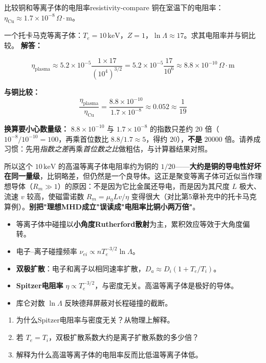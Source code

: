 \documentclass[12pt,a4paper,openany,oneside]{book}
\newcommand{\difficulty}[1]{\marginnote{\hfill\textcolor{coverMid!80}{\rule[-0.1em]{2pt}{0.9em}}\,\textcolor{coverMid}{\footnotesize\textbf{[#1]}}}}
\begin{document}
\begin{example}{比较铜和等离子体的电阻率}{resistivity-compare}
\difficulty{提高}
铜在室温下的电阻率：$\eta_{\text{Cu}} \approx 1.7\times 10^{-8}\,\Omega\cdot\mathrm{m}$。

一个托卡马克等离子体：$T_e = 10\,\mathrm{keV}$，$Z=1$，$\ln\Lambda \approx 17$。求其电阻率并与铜比较。
\tcblower
\textbf{解答：}

\[
\eta_{\text{plasma}} \approx 5.2\times 10^{-5} \frac{1\times 17}{(10^4)^{3/2}} = 5.2\times 10^{-5} \frac{17}{10^6} \approx 8.8\times 10^{-10}\,\Omega\cdot\mathrm{m}
\]

\textbf{与铜比较：}
\[
\frac{\eta_{\text{plasma}}}{\eta_{\text{Cu}}} = \frac{8.8\times 10^{-10}}{1.7\times 10^{-8}} \approx 0.052 \approx \frac{1}{19}
\]

\textbf{换算要小心数量级：} $8.8\times10^{-10}$ 与 $1.7\times10^{-8}$ 的指数只差约 20 倍（$10^{-8}/10^{-10}=100$，再乘首位数比 $8.8/1.7\approx5$，得约 $20$），\textbf{不是} $20000$ 倍。请养成习惯：先用\emph{指数之差}再乘\emph{首位数之比}做粗估，与计算器结果对照。

所以这个 $10\,\mathrm{keV}$ 的高温等离子体电阻率约为铜的 $1/20$——\textbf{大约是铜的导电性好坏在同一量级}，比铜略差，但仍然是一个良导体。这正是聚变等离子体可近似当作理想导体（$R_m\gg1$）的原因：不是因为它比金属还导电，而是因为其尺度 $L$ 极大、流速 $v$ 较高，使磁雷诺数 $R_m=\mu_0Lv/\eta$ 变得很大（对比第5章补充中的托卡马克算例）。\textbf{别把"理想MHD成立"误读成"电阻率比铜小两万倍"}。
\end{example}

\begin{chapterreview}
\begin{itemize}
\item 等离子体中碰撞以\textbf{小角度Rutherford散射}为主，累积效应等效于大角度偏转。
\item 电子--离子碰撞频率 $\nu_{ei} \propto n T_e^{-3/2} \ln\Lambda$。
\item \textbf{双极扩散}：电子和离子以相同速率扩散，$D_a \approx D_i(1+T_e/T_i)$。
\item \textbf{Spitzer电阻率} $\eta \propto T_e^{-3/2}$，与密度无关。高温等离子体是极好的导体。
\item 库仑对数 $\ln\Lambda$ 反映德拜屏蔽对长程碰撞的截断。
\end{itemize}
\end{chapterreview}

\begin{miniquiz}
\begin{enumerate}
\item 为什么Spitzer电阻率与密度无关？从物理上解释。
\item 若 $T_e = T_i$，双极扩散系数大约是离子扩散系数的多少倍？
\item 解释为什么高温等离子体的电阻率反而比低温等离子体低。
\end{enumerate}
\end{miniquiz}
\end{document}
